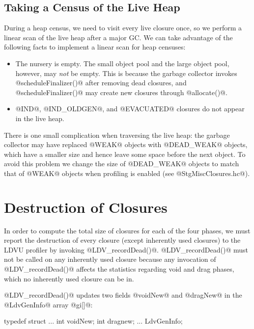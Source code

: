 \documentclass{article}
\begin{document}
\subsection{Taking a Census of the Live Heap}

During a heap census, we need to visit every live closure once, so we
perform a linear scan of the live heap after a major GC.  We can take
advantage of the following facts to implement a linear scan for heap
censuses:

\begin{itemize}
\item The nursery is empty. The small object pool and the large object pool, 
      however, may \emph{not} be empty. This is because the garbage collector
      invokes @scheduleFinalizer()@ after removing dead closures, and
      @scheduleFinalizer()@ may create new closures through @allocate()@.
\item @IND@, @IND_OLDGEN@, and @EVACUATED@ closures do not appear in
the live heap.
\end{itemize}

There is one small complication when traversing the live heap: the
garbage collector may have replaced @WEAK@ objects with @DEAD_WEAK@
objects, which have a smaller size and hence leave some space before
the next object.  To avoid this problem we change the size of
@DEAD_WEAK@ objects to match that of @WEAK@ objects when profiling is
enabled (see @StgMiscClosures.hc@).

\section{Destruction of Closures}

In order to compute the total size of closures for each of the four
phases, we must report the destruction of every closure (except
inherently used closures) to the LDVU profiler by invoking
@LDV_recordDead()@.  @LDV_recordDead()@ must not be called on any
inherently used closure because any invocation of @LDV_recordDead()@
affects the statistics regarding void and drag phases, which no
inherently used closure can be in.

@LDV_recordDead()@ updates two fields @voidNew@ and @dragNew@ in the
@LdvGenInfo@ array @gi[]@:

\begin{code}
typedef struct {
  ...
  int voidNew; 
  int dragnew;
  ...
} LdvGenInfo;
\end{code} 
\end{document}
